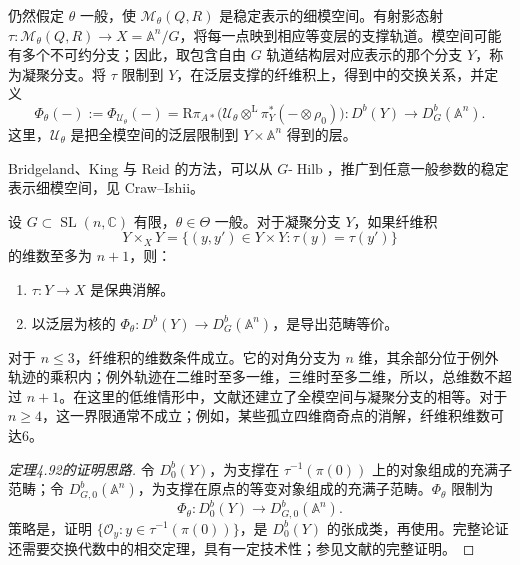 仍然假定 $\theta$ 一般，使 $\mathcal{M}_\theta(Q,R)$ 是稳定表示的细模空间。有射影态射 $\tau\colon\mathcal{M}_\theta(Q,R)\to X=\mathbb{A}^n/G$，将每一点映到相应等变层的支撑轨道。模空间可能有多个不可约分支；因此，取包含自由 $G$ 轨道结构层对应表示的那个分支 $Y$，称为凝聚分支。将 $\tau$ 限制到 $Y$，在泛层支撑的纤维积上，得到中的交换关系，并定义
\begin{equation}\label{eq:4.13}
\Phi_\theta(-):=\Phi_{\mathcal{U}_\theta}(-)
=\mathrm{R}\pi_{A*}\bigl(\mathcal{U}_\theta
\otimes^{\mathrm{L}}\pi_Y^*(-\otimes\rho_0)\bigr)
\colon D^b(Y)\longrightarrow D_G^b(\mathbb{A}^n).
\end{equation}
这里，$\mathcal{U}_\theta$ 是把全模空间的泛层限制到 $Y\times\mathbb{A}^n$ 得到的层。

Bridgeland、King 与 Reid 的方法，可以从 $G\text{-}\operatorname{Hilb}$，推广到任意一般参数的稳定表示细模空间，见 Craw--Ishii。
\begin{theorem}\label{thm:4.92}
设 $G\subset\operatorname{SL}(n,\mathbb{C})$ 有限，$\theta\in\Theta$ 一般。对于凝聚分支 $Y$，如果纤维积
\[
Y\times_XY=\{(y,y')\in Y\times Y:\tau(y)=\tau(y')\}
\]
的维数至多为 $n+1$，则：
\begin{enumerate}[label=(\arabic*)]
\item $\tau\colon Y\to X$ 是保典消解。
\item 以泛层为核的 $\Phi_\theta\colon D^b(Y)\to D_G^b(\mathbb{A}^n)$，是导出范畴等价。
\end{enumerate}
\end{theorem}

\begin{note}[93]\label{note:4.93}
对于 $n\le3$，纤维积的维数条件成立。它的对角分支为 $n$ 维，其余部分位于例外轨迹的乘积内；例外轨迹在二维时至多一维，三维时至多二维，所以，总维数不超过 $n+1$。在这里的低维情形中，文献还建立了全模空间与凝聚分支的相等。对于 $n\ge4$，这一界限通常不成立；例如，某些孤立四维商奇点的消解，纤维积维数可达6。
\end{note}

\begin{proof}[定理4.92的证明思路]
令 $D_0^b(Y)$，为支撑在 $\tau^{-1}(\pi(0))$ 上的对象组成的充满子范畴；令 $D_{G,0}^b(\mathbb{A}^n)$，为支撑在原点的等变对象组成的充满子范畴。$\Phi_\theta$ 限制为
\begin{equation}\label{eq:4.14}
\Phi_\theta\colon D_0^b(Y)\longrightarrow D_{G,0}^b(\mathbb{A}^n).
\end{equation}
策略是，证明 $\{\mathcal{O}_y:y\in\tau^{-1}(\pi(0))\}$，是 $D_0^b(Y)$ 的张成类，再使用。完整论证还需要交换代数中的相交定理，具有一定技术性；参见文献的完整证明。\BookQED
\end{proof}


